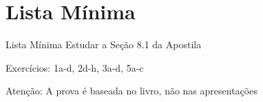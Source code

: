 \section{Lista Mínima}

\begin{frame}{Lista Mínima}
  Estudar a Seção 8.1 da Apostila

  \vfill
  Exercícios: 1a-d, 2d-h, 3a-d, 5a-c

  \vfill
  Atenção: A prova é baseada no livro, não nas apresentações
\end{frame}


